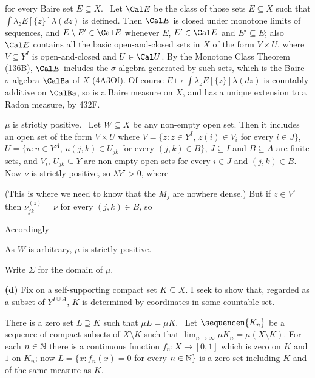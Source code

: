 {\noindent for every Baire set $E\subseteq X$.   \Prf\ Let $\Cal E$ be 
the class of those sets $E\subseteq X$ such that 
$\int\lambda_zE[\{z\}]\lambda(dz)$ is defined.   Then $\Cal E$ is closed 
under monotone limits of sequences, and $E\setminus E'\in\Cal E$ 
whenever $E$, $E'\in\Cal E$ and $E'\subseteq E$;  also $\Cal E$ contains 
all the basic open-and-closed sets in $X$ of the form 
$V\times U$, where $V\subseteq Y^I$ is open-and-closed and $U\in\Cal U$. 
By the Monotone Class Theorem (136B), $\Cal E$ includes the 
$\sigma$-algebra generated by such sets, which is the Baire 
$\sigma$-algebra $\CalBa$ of $X$ (4A3Of).   Of course 
$E\mapsto\int\lambda_zE[\{z\}]\lambda(dz)$ is countably additive on 
$\CalBa$, so is a Baire measure on $X$, and has a unique extension to 
a Radon measure, by 432F.\ \Qed 
      
$\mu$ is strictly positive.  \Prf\ Let $W\subseteq X$ be any non-empty 
open set.   Then it includes an open set of the form $V\times U$ where 
$V=\{z:z\in Y^I,\,z(i)\in V_i$ for every $i\in J\}$, 
$U=\{u:u\in Y^A,\,u(j,k)\in U_{jk}$ for every $(j,k)\in B\}$, 
$J\subseteq I$ and 
$B\subseteq A$ are finite sets, and $V_i$, $U_{jk}\subseteq Y$ are 
non-empty open sets for every $i\in J$ and $(j,k)\in B$.   Now $\nu$ is 
strictly positive, so $\lambda V'>0$, where 
      
      
\noindent (This is where we need to know that the $M_j$ are nowhere 
dense.)   But if $z\in V'$ then $\nu_{jk}^{(z)}=\nu$ for every 
$(j,k)\in B$, so 
      
      
\noindent Accordingly 
      
      
\noindent As $W$ is arbitrary, $\mu$ is strictly positive.\ \Qed 
      
Write $\Sigma$ for the domain of $\mu$. 
      
\medskip 
      
{\bf (d)} Fix on a self-supporting compact set $K\subseteq X$.   I seek 
to show that, regarded as a subset of $Y^{I\cup A}$, $K$ is determined 
by coordinates in some countable set. 
      
\medskip 
      
 There is a zero set $L\supseteq K$ such that 
$\mu L=\mu K$.   \Prf\ Let $\sequencen{K_n}$ be a sequence of compact 
subsets of 
$X\setminus K$ such that $\lim_{n\to\infty}\mu K_n=\mu(X\setminus K)$. 
For each $n\in\Bbb N$ there is a continuous function $f_n:X\to[0,1]$ 
which is zero on $K$ and $1$ on $K_n$;  now $L=\{x:f_n(x)=0$ for every 
$n\in\Bbb N\}$ is a zero set including $K$ and of the same measure as 
$K$.\ \Qed 
      
}
